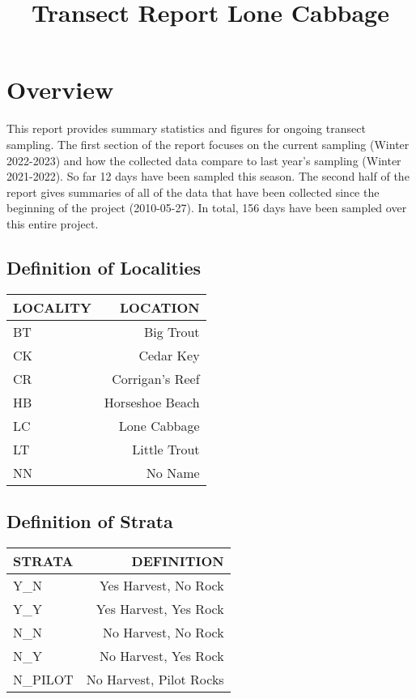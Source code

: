 \documentclass[
]{article}
\title{Transect Report Lone Cabbage}
\author{}
\date{\vspace{-2.5em}}
\begin{document}
\maketitle

\hypertarget{overview}{%
\section{Overview}\label{overview}}

This report provides summary statistics and figures for ongoing transect
sampling. The first section of the report focuses on the current
sampling (Winter 2022-2023) and how the collected data compare to last
year's sampling (Winter 2021-2022). So far 12 days have been sampled
this season. The second half of the report gives summaries of all of the
data that have been collected since the beginning of the project
(2010-05-27). In total, 156 days have been sampled over this entire
project.

\hypertarget{definition-of-localities}{%
\subsection{Definition of Localities}\label{definition-of-localities}}

\begingroup\Large

\begin{longtable}[]{@{}lr@{}}
\toprule()
LOCALITY & LOCATION \\
\midrule()
\endhead
BT & Big Trout \\
CK & Cedar Key \\
CR & Corrigan's Reef \\
HB & Horseshoe Beach \\
LC & Lone Cabbage \\
LT & Little Trout \\
NN & No Name \\
\bottomrule()
\end{longtable}

\endgroup

\hypertarget{definition-of-strata}{%
\subsection{Definition of Strata}\label{definition-of-strata}}

\begingroup\Large

\begin{longtable}[]{@{}lr@{}}
\toprule()
STRATA & DEFINITION \\
\midrule()
\endhead
Y\_N & Yes Harvest, No Rock \\
Y\_Y & Yes Harvest, Yes Rock \\
N\_N & No Harvest, No Rock \\
N\_Y & No Harvest, Yes Rock \\
N\_PILOT & No Harvest, Pilot Rocks \\
\bottomrule()
\end{longtable}
\end{document}
